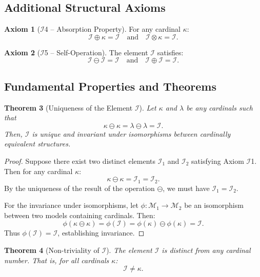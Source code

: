 \documentclass[12pt,a4paper]{article}
\newtheorem{theorem}{Theorem}[section]
\theoremstyle{definition}
\newtheorem{axiom}[theorem]{Axiom}
\theoremstyle{remark}
\begin{document}
\subsection{Additional Structural Axioms}

\begin{axiom}[$\mathcal{I}$4 -- Absorption Property]
For any cardinal $\kappa$:
\[
\mathcal{I} \oplus \kappa = \mathcal{I} \quad \text{and} \quad \mathcal{I} \otimes \kappa = \mathcal{I}.
\]
\end{axiom}

\begin{axiom}[$\mathcal{I}$5 -- Self-Operation]
The element $\mathcal{I}$ satisfies:
\[
\mathcal{I} \ominus \mathcal{I} = \mathcal{I} \quad \text{and} \quad \mathcal{I} \oplus \mathcal{I} = \mathcal{I}.
\]
\end{axiom}

\subsection{Fundamental Properties and Theorems}

\begin{theorem}[Uniqueness of the Element $\mathcal{I}$]
\label{thm:uniqueness}
Let $\kappa$ and $\lambda$ be any cardinals such that
\[
\kappa \ominus \kappa = \lambda \ominus \lambda = \mathcal{I}.
\]
Then, $\mathcal{I}$ is unique and invariant under isomorphisms between cardinally equivalent structures.
\end{theorem}

\begin{proof}
Suppose there exist two distinct elements $\mathcal{I}_1$ and $\mathcal{I}_2$ satisfying Axiom $\mathcal{I}$1. Then for any cardinal $\kappa$:
\[
\kappa \ominus \kappa = \mathcal{I}_1 = \mathcal{I}_2.
\]
By the uniqueness of the result of the operation $\ominus$, we must have $\mathcal{I}_1 = \mathcal{I}_2$.

For the invariance under isomorphisms, let $\phi : \mathcal{M}_1 \to \mathcal{M}_2$ be an isomorphism between two models containing cardinals. Then:
\[
\phi(\kappa \ominus \kappa) = \phi(\mathcal{I}) = \phi(\kappa) \ominus \phi(\kappa) = \mathcal{I}.
\]
Thus $\phi(\mathcal{I}) = \mathcal{I}$, establishing invariance.
\end{proof}

\begin{theorem}[Non-triviality of $\mathcal{I}$]
The element $\mathcal{I}$ is distinct from any cardinal number. That is, for all cardinals $\kappa$:
\[
\mathcal{I} \neq \kappa.
\]
\end{theorem}
\end{document}
